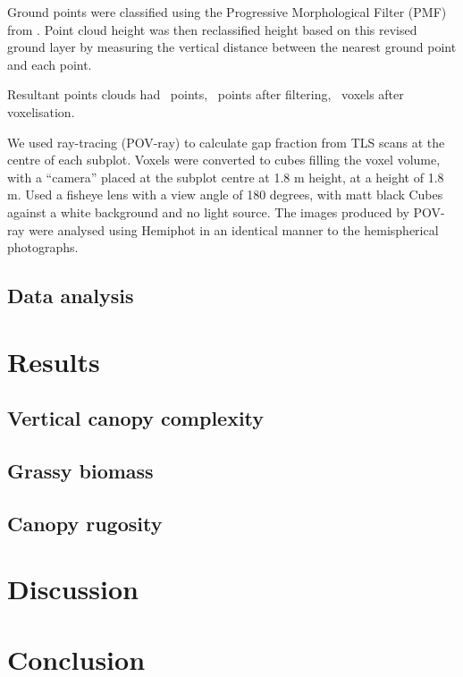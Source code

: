 \documentclass[11pt,a4paper]{article}
\newcommand{\beginsupplement}{%
	\setcounter{table}{0}
	\renewcommand{\thetable}{S\arabic{table}}%
	\setcounter{figure}{0}
	\renewcommand{\thefigure}{S\arabic{figure}}%
}
\begin{document}
Ground points were classified using the Progressive Morphological Filter (PMF) from \citep{Zhang2003}. Point cloud height was then reclassified height based on this revised ground layer by measuring the vertical distance between the nearest ground point and each point.

Resultant points clouds had ~points, ~points after filtering, ~voxels after voxelisation.

We used ray-tracing (POV-ray) to calculate gap fraction from TLS scans at the centre of each subplot. Voxels were converted to cubes filling the voxel volume, with a ``camera'' placed at the subplot centre at 1.8 m height, at a height of 1.8 m. Used a fisheye lens with a view angle of 180 degrees, with matt black Cubes against a white background and no light source. The images produced by POV-ray were analysed using Hemiphot in an identical manner to the hemispherical photographs.

\subsection{Data analysis}


\section{Results}

\subsection{Vertical canopy complexity}

\subsection{Grassy biomass}

\subsection{Canopy rugosity}


\section{Discussion}



\section{Conclusion}

\printbibliography

\end{document}
